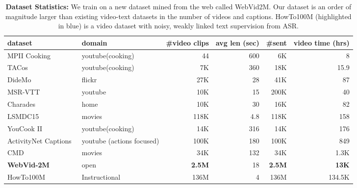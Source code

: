 \documentclass[10pt,twocolumn,letterpaper]{article}
\begin{document}
 

\begin{table*}
\centering
\caption{\textbf{Dataset Statistics:} We train on a new dataset mined from the web called WebVid2M. Our dataset is an order of magnitude larger than existing video-text datasets in the number of videos and captions. HowTo100M (highlighted in blue) is a video dataset with noisy, weakly linked text supervision from ASR.}
\begin{tabular}{llrrrr}
\toprule
\textbf{dataset} & \textbf{domain} & \textbf{\#video clips} & \textbf{avg len (sec)} & \textbf{\#sent} & \textbf{video time (hrs)}\\ \midrule
MPII Cooking~\cite{rohrbach2012database} & youtube(cooking) & 44 & 600 & 6K & 8\\ 

TACos~\cite{regneri2013grounding} & youtube(cooking) & 7K & 360 & 18K & 15.9  \\ 


DideMo~\cite{anne2017localizing} & flickr & 27K & 28 & 41K & 87\\ 
MSR-VTT~\cite{xu2016msr} & youtube & 10K & 15 & 200K & 40 \\ 
Charades~\cite{sigurdsson2016hollywood} & home & 10K & 30 & 16K & 82 \\ 
LSMDC15~\cite{rohrbach2017movie} & movies & 118K & 4.8 & 118K & 158\\ 
YouCook II~\cite{zhou2018towards} & youtube(cooking)& 14K & 316 & 14K & 176 \\ 
ActivityNet Captions~\cite{krishna2017dense} & youtube  (actions focused) & 100K & 180 & 100K & 849 \\ 
CMD~\cite{bain2020condensed} & movies & 34K & 132 & 34K & 1.3K \\
\textbf{WebVid-2M} & open  & \textbf{2.5M} & 18 & \textbf{2.5M} & \textbf{13K} \\ \rowcolor{aliceblue}
HowTo100M~\cite{miech2019howto100m} & Instructional & 136M & 4 & 136M &  134.5K \\ 



\bottomrule            
\end{tabular}
\label{tab:datastats}
\end{table*} 
\end{document}
